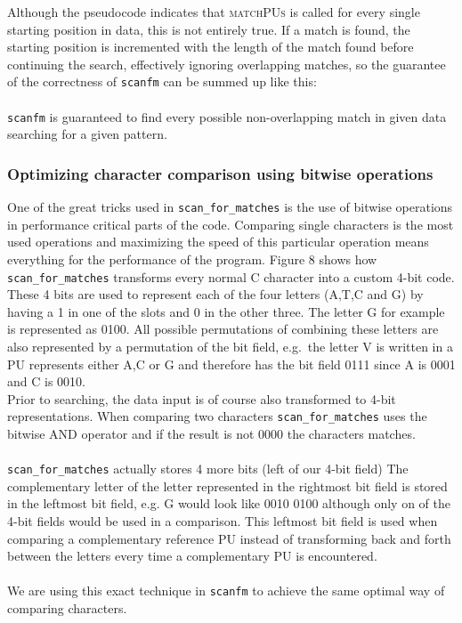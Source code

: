 \documentclass[12pt]{article}
\newcommand{\scm}{\texttt{scan\_for\_matches} }
\newcommand{\sfm}{\texttt{scanfm} }
\newcommand{\pu}{PU }
\begin{document}
\noindent Although the pseudocode indicates that \textsc{\small matchPUs} is called for every single starting position
in data, this is not entirely true. If a match is found, the starting position is incremented with the length of 
the match found before continuing the search, effectively ignoring overlapping matches, so the guarantee of the correctness of \sfm can be summed up like 
this: \\ \\
\sfm is guaranteed to find every possible non-overlapping match in given data searching for a given pattern.
\subsubsection{Optimizing character comparison using bitwise operations}
One of the great tricks used in \scm is the use of bitwise operations in performance critical parts of the code.
Comparing single characters is the most used operations and maximizing the speed of this particular operation 
means everything for the performance of the program. Figure 8 shows how \scm transforms every normal C character into
a custom 4-bit code. These 4 bits are used to represent each of the four letters (A,T,C and G) by having a 1 in one of
the slots and 0 in the other three. The letter G for example is represented as 0100. All possible permutations of 
combining these letters are also represented by a permutation of the bit field, e.g.\ the letter V is written in a \pu 
represents either A,C or G and therefore has the bit field 0111 since A is 0001 and C is 0010. \\
Prior to searching, the data input is of course also transformed to 4-bit representations.
When comparing two characters \scm uses the bitwise AND operator and if the result is not 0000 the characters matches. \\ \\
\scm actually stores 4 more bits (left of our 4-bit field) The complementary letter of the letter represented in the rightmost
bit field is stored in the leftmost bit field, e.g. G would look like 0010 0100 although only on of the 4-bit fields would
be used in a comparison. This leftmost bit field is used when comparing a complementary reference \pu instead
of transforming back and forth between the letters every time a complementary \pu is encountered. \\ \\
We are using this exact technique in \sfm to achieve the same optimal way of comparing characters.
\end{document}
